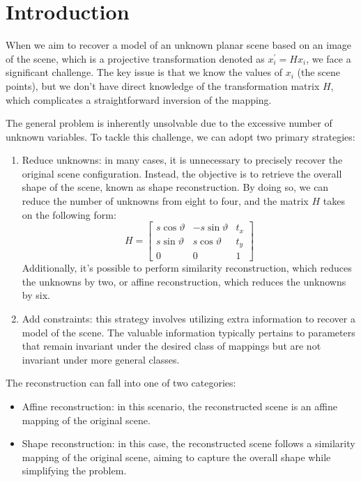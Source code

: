 \section{Introduction}

When we aim to recover a model of an unknown planar scene based on an image of the scene, which is a projective transformation denoted as $x_i^{'}=Hx_i$, we face a significant challenge.
The key issue is that we know the values of $x_i$ (the scene points), but we don't have direct knowledge of the transformation matrix $H$, which complicates a straightforward inversion of the mapping.

The general problem is inherently unsolvable due to the excessive number of unknown variables. 
To tackle this challenge, we can adopt two primary strategies:
\begin{enumerate}
    \item Reduce unknowns: in many cases, it is unnecessary to precisely recover the original scene configuration. 
        Instead, the objective is to retrieve the overall shape of the scene, known as shape reconstruction. 
        By doing so, we can reduce the number of unknowns from eight to four, and the matrix $H$ takes on the following form:
        \[H=    
        \begin{bmatrix}
            s\cos \vartheta & -s\sin \vartheta & t_x \\
            s\sin \vartheta & s\cos \vartheta & t_y \\
            0 & 0 & 1
        \end{bmatrix}\]
        Additionally, it's possible to perform similarity reconstruction, which reduces the unknowns by two, or affine reconstruction, which reduces the unknowns by six.
    \item Add constraints: this strategy involves utilizing extra information to recover a model of the scene. 
        The valuable information typically pertains to parameters that remain invariant under the desired class of mappings but are not invariant under more general classes.
\end{enumerate}

The reconstruction can fall into one of two categories:
\begin{itemize}
    \item Affine reconstruction: in this scenario, the reconstructed scene is an affine mapping of the original scene.
    \item Shape reconstruction: in this case, the reconstructed scene follows a similarity mapping of the original scene, aiming to capture the overall shape while simplifying the problem.
\end{itemize}